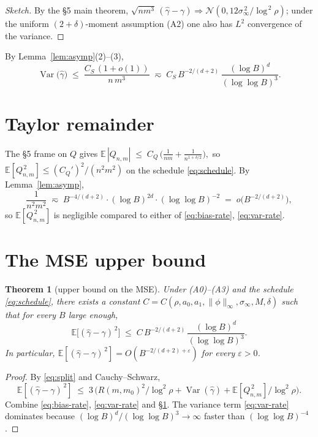 \documentclass[11pt]{article}
\newcommand{\E}{\mathbb{E}}
\newcommand{\Var}{\operatorname{Var}}
\theoremstyle{plain}
\newtheorem{theorem}{Theorem}
\theoremstyle{definition}
\begin{document}
\begin{proof}[Sketch]
By the §5 main theorem, $\sqrt{nm^{3}}\,(\hat\gamma - \gamma)
\Rightarrow \mathcal{N}(0, 12\sigma_\infty^{\,2}/\log^{\,2}\rho)$; under the
uniform $(2+\delta)$-moment assumption (A2) one also has $L^{2}$
convergence of the variance.
\end{proof}

By Lemma~\ref{lem:asymp}(2)--(3),
\begin{equation}\label{eq:var-rate}
  \Var\!\bigl(\hat\gamma\bigr)
  \;\le\;
  \frac{C_S\,(1+o(1))}{n\,m^{3}}
  \;\eqsim\;
  C_S\,B^{-2/(d+2)}\,\frac{(\log B)^{d}}{(\log\log B)^{3}}.
\end{equation}

\section{Taylor remainder}\label{sec:taylor}

The §5 frame on $Q$ gives
\(
  \E\,|Q_{n,m}|
  \;\le\;
  C_Q\,\bigl(\tfrac{1}{nm} + \tfrac{1}{n^{1+\delta/2}}\bigr),
\)
so $\E[Q_{n,m}^{\,2}] \le (C_Q')^{2}/(n^{2} m^{2})$ on the schedule
\eqref{eq:schedule}. By Lemma~\ref{lem:asymp},
\[
  \frac{1}{n^{2}m^{2}}
  \;\eqsim\;
  B^{-4/(d+2)}\cdot(\log B)^{2d}\cdot(\log\log B)^{-2}
  \;=\;
  o\!\bigl(B^{-2/(d+2)}\bigr),
\]
so $\E[Q_{n,m}^{\,2}]$ is negligible compared to either of
\eqref{eq:bias-rate}, \eqref{eq:var-rate}.

\section{The MSE upper bound}\label{sec:mse}

\begin{theorem}[upper bound on the MSE]\label{thm:upper}
Under (A0)--(A3) and the schedule \eqref{eq:schedule}, there exists a
constant $C = C(\rho, a_0, a_1, \|\phi\|_\infty, \sigma_\infty, M, \delta)$
such that for every $B$ large enough,
\begin{equation}\label{eq:main-upper}
  \E\bigl[(\hat\gamma - \gamma)^{\,2}\bigr]
  \;\le\;
  C\,B^{-2/(d+2)}\,\frac{(\log B)^{d}}{(\log\log B)^{3}}.
\end{equation}
In particular, $\E[(\hat\gamma - \gamma)^{\,2}] = O(B^{-2/(d+2)+\varepsilon})$
for every $\varepsilon>0$.
\end{theorem}

\begin{proof}
By \eqref{eq:split} and Cauchy--Schwarz,
\[
  \E[(\hat\gamma - \gamma)^{\,2}]
  \;\le\;
  3\,\bigl( R(m,m_0)^{2}/\log^{2}\!\rho
        + \Var(\hat\gamma)
        + \E[Q_{n,m}^{\,2}]/\log^{2}\!\rho \bigr).
\]
Combine \eqref{eq:bias-rate}, \eqref{eq:var-rate} and §\ref{sec:taylor}.
The variance term \eqref{eq:var-rate} dominates because
$(\log B)^{d}/(\log\log B)^{3} \to \infty$ faster than
$(\log\log B)^{-4}$.
\end{proof}
\end{document}
